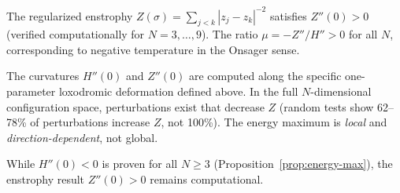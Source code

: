The regularized enstrophy $Z(\sigma) = \sum_{j<k}|z_j - z_k|^{-2}$
satisfies $Z''(0) > 0$ (verified computationally for $N = 3, \ldots, 9$).
The ratio $\mu = -Z''/H'' > 0$ for all $N$, corresponding to negative
temperature in the Onsager sense.

\begin{remark}
The curvatures $H''(0)$ and $Z''(0)$ are computed along the specific
one-parameter loxodromic deformation defined above.  In the full
$N$-dimensional configuration space, perturbations exist that decrease
$Z$ (random tests show 62--78\% of perturbations increase $Z$, not
100\%).  The energy maximum is \emph{local} and
\emph{direction-dependent}, not global.

While $H''(0) < 0$ is proven for all $N \ge 3$
(Proposition~\ref{prop:energy-max}), the enstrophy result $Z''(0) > 0$
remains computational.
\end{remark}
